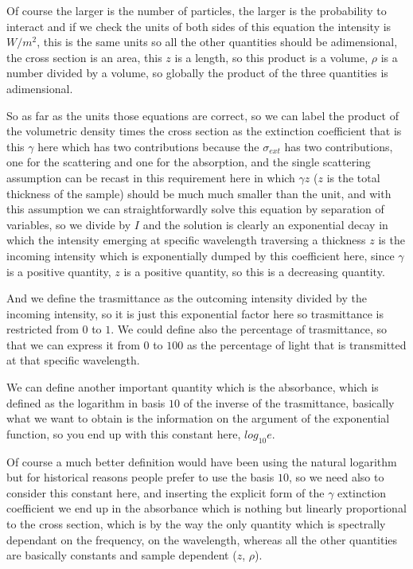 \documentclass[../main/main.tex]{subfiles}
\begin{document}
Of course the larger is the number of particles, the larger is the probability to interact and if we check the units of both sides of this equation the intensity is $W/m^2$, this is the same units so all the other quantities should be adimensional, the cross section is an area, this $z$ is a length, so this product is a volume, $\rho$ is a number divided by a volume, so globally the product of the three quantities is adimensional.

So as far as the units those equations are correct, so we can label the product of the volumetric density times the cross section as the extinction coefficient that is this $\gamma$ here which has two contributions because the $\sigma_{ext}$ has two contributions, one for the scattering and one for the absorption, and the single scattering assumption can be recast in this requirement here in which $\gamma z$ ($z$ is the total thickness of the sample) should be much much smaller than the unit, and with this assumption we can straightforwardly solve this equation by separation of variables, so we divide by $I$ and the solution is clearly an exponential decay in which the intensity emerging at specific wavelength traversing a thickness $z$ is the incoming intensity which is exponentially dumped by this coefficient here, since $\gamma$ is a positive quantity, $z$ is a positive quantity, so this is a decreasing quantity.

And we define the trasmittance as the outcoming intensity divided by the incoming intensity, so it is just this exponential factor here so trasmittance is restricted from $0$ to $1$. We could define also the percentage of trasmittance, so that we can express it from $0$ to $100$ as the percentage of light that is transmitted at that specific wavelength.

We can define another important quantity which is the absorbance, which is defined as the logarithm in basis $10$ of the inverse of the trasmittance, basically what we want to obtain is the information on the argument of the exponential function, so you end up with this constant  here, $log_{10}e$. 

Of course a much better definition would have been using the natural logarithm but for historical  reasons people prefer to use the basis $10$, so we need also to consider this constant here, and inserting the explicit form of the $\gamma$ extinction coefficient we end up in the absorbance which is nothing but linearly proportional to the cross section, which is by the way the only quantity which is spectrally dependant on the frequency, on the wavelength, whereas all the other quantities are basically constants and sample dependent ($z$, $\rho$).
\end{document}
